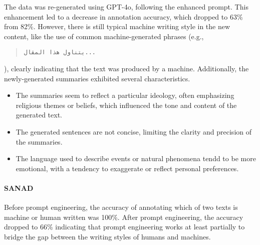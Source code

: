 The data was re-generated using GPT-4o, following the enhanced prompt. This enhancement led to a decrease in annotation accuracy, which dropped to 63\% from 82\%. 
However, there is still typical machine writing style in the new content, like the use of common machine-generated phrases (e.g., \begin{quote}
    \small
    \begin{RLtext}
            \texttt{يتناول هذا المقال...}
    \end{RLtext}
\end{quote} ), clearly indicating that the text was produced by a machine.
Additionally, the newly-generated summaries exhibited several characteristics.
\begin{itemize}
    \item The summaries seem to reflect a particular ideology, often emphasizing religious themes or beliefs, which influenced the tone and content of the generated text.
    \item The generated sentences are not concise, limiting the clarity and precision of the summaries.
    \item The language used to describe events or natural phenomena tendd to be more emotional, with a tendency to exaggerate or reflect personal preferences.
\end{itemize}



\paragraph{SANAD}
Before prompt engineering, the accuracy of annotating which of two texts is machine or human written was 100\%. After prompt engineering, the accuracy dropped to 66\% indicating that prompt engineering works at least partially to bridge the gap between the writing styles of humans and machines. 

